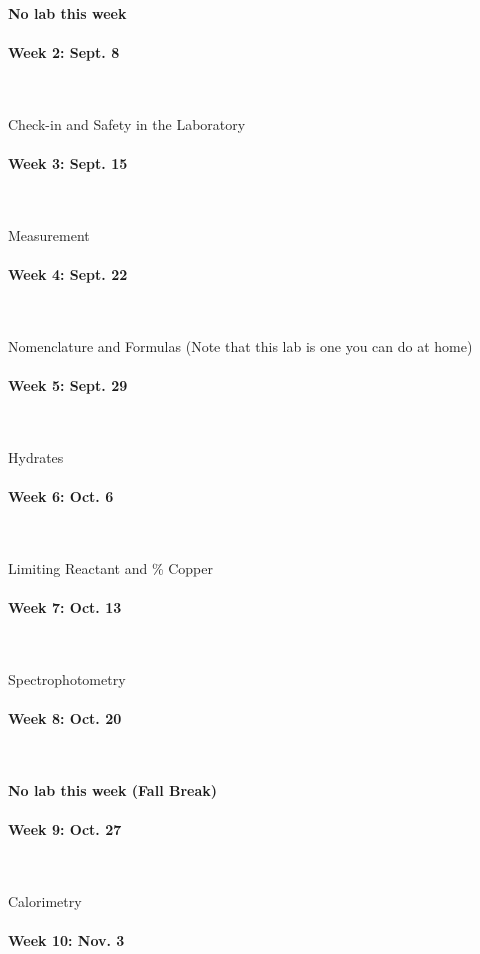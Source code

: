 \documentclass[12pt, letterpaper]{article}
\begin{document}
\textbf{No lab this week}

\paragraph{Week 2: Sept. 8}~

Check-in and Safety in the Laboratory

\paragraph{Week 3: Sept. 15}~

Measurement

\paragraph{Week 4: Sept. 22}~

Nomenclature and Formulas (Note that this lab is one you can do at home)

\paragraph{Week 5: Sept. 29}~

Hydrates

\paragraph{Week 6: Oct. 6}~

Limiting Reactant and \% Copper

\paragraph{Week 7: Oct. 13}~

Spectrophotometry

\paragraph{Week 8: Oct. 20}~

\textbf{No lab this week (Fall Break)}

\paragraph{Week 9: Oct. 27}~

Calorimetry

\paragraph{Week 10: Nov. 3}~
\end{document}
